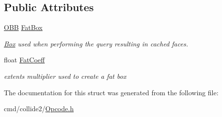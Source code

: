 \subsection*{Public Attributes}
\begin{DoxyCompactItemize}
\item 
\hyperlink{classOpcode_1_1OBB}{O\+BB} \hyperlink{structOpcode_1_1OBBCache_a079d051eae760548e0be835f55317b54}{Fat\+Box}\hypertarget{structOpcode_1_1OBBCache_a079d051eae760548e0be835f55317b54}{}\label{structOpcode_1_1OBBCache_a079d051eae760548e0be835f55317b54}

\begin{DoxyCompactList}\small\item\em \hyperlink{classBox}{Box} used when performing the query resulting in cached faces. \end{DoxyCompactList}\item 
float \hyperlink{structOpcode_1_1OBBCache_a3f28152c5d87506709250c942ccd8901}{Fat\+Coeff}\hypertarget{structOpcode_1_1OBBCache_a3f28152c5d87506709250c942ccd8901}{}\label{structOpcode_1_1OBBCache_a3f28152c5d87506709250c942ccd8901}

\begin{DoxyCompactList}\small\item\em extents multiplier used to create a fat box \end{DoxyCompactList}\end{DoxyCompactItemize}


The documentation for this struct was generated from the following file\+:\begin{DoxyCompactItemize}
\item 
cmd/collide2/\hyperlink{Opcode_8h}{Opcode.\+h}\end{DoxyCompactItemize}
